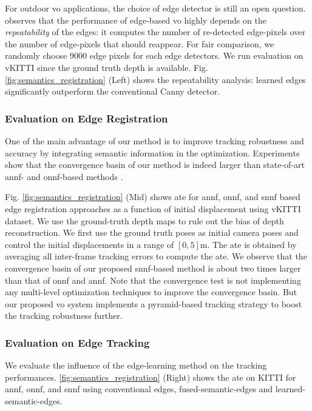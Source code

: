 For outdoor \acrshort{vo} applications, the choice of edge detector is still an open question. 
\cite{schenk2017robust} observes that the performance of edge-based \acrshort{vo} highly depends on the {\em repeatability} of the edges: it computes the number of re-detected edge-pixels over the number of edge-pixels that should reappear. 
For fair comparison, we randomly choose 9000 edge pixels for each edge detectors. 
We run evaluation on vKITTI \cite{gaidon2016virtual} since the ground truth depth is available.  
Fig. \ref{fig:semantics_registration} (Left) shows the repeatability analysis: learned edges significantly outperform the conventional Canny detector.  

\subsubsection{Evaluation on Edge Registration } 

One of the main advantage of our method is to improve tracking robustness and accuracy by integrating semantic information in the optimization.  Experiments show that the convergence basin of our method is indeed larger than state-of-art \acrshort{annf}- and \acrshort{onnf}-based methods \cite{zhou2019canny}. 

Fig. \ref{fig:semantics_registration} (Mid) shows \acrshort{ate} for \acrshort{annf}, \acrshort{onnf}, and \acrshort{snnf} based edge registration approaches as a function of initial displacement using vKITTI dataset. 
We use the ground-truth depth maps to rule out the bias of depth reconstruction.  
We first use the ground truth poses as initial camera poses and control the initial displacements in a range of $[0,5]$m.  
The \acrshort{ate} is obtained by averaging all inter-frame tracking errors to compute the \acrshort{ate}.  
We observe that the convergence basin of our proposed \acrshort{snnf}-based method is about two times larger than that of \acrshort{onnf} and \acrshort{annf}. 
Note that the convergence test is not implementing any multi-level optimization techniques to improve the convergence basin. 
But our proposed \acrshort{vo} system implements a pyramid-based tracking strategy to boost the tracking robustness further.

\subsubsection{Evaluation on Edge Tracking} 
We evaluate the influence of the edge-learning method on the tracking performances.
\ref{fig:semantics_registration} (Right) shows the \acrshort{ate} on KITTI for \acrshort{annf},
\acrshort{onnf}, and \acrshort{snnf} using conventional edges, fused-semantic-edges and learned-semantic-edges.

